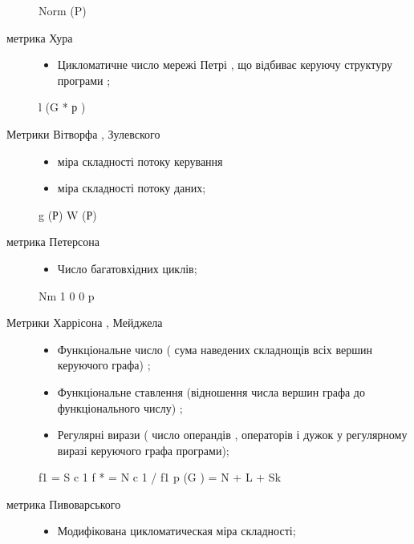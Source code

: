 \begin{description}
\begin{itemize}
\end{itemize}

Norm (P)

\item[{метрика Хура}] \leavevmode\begin{itemize}
\item {} 
Цикломатичне число мережі Петрі , що відбиває керуючу структуру програми ;

\end{itemize}

l (G * р )

\item[{Метрики Вітворфа , Зулевского}] \leavevmode\begin{itemize}
\item {} 
міра складності потоку керування

\item {} 
міра складності потоку даних;

\end{itemize}

g (Р)
W (Р)

\item[{метрика Петерсона}] \leavevmode\begin{itemize}
\item {} 
Число багатовхідних циклів;

\end{itemize}

Nm 1 0 0 p

\item[{Метрики Харрісона , Мейджела}] \leavevmode\begin{itemize}
\item {} 
Функціональне число ( сума наведених складнощів всіх вершин керуючого графа) ;

\item {} 
Функціональне ставлення (відношення числа вершин графа до функціонального числу) ;

\item {} 
Регулярні вирази ( число операндів , операторів і дужок у регулярному виразі керуючого графа програми);

\end{itemize}

f1 = S c 1
f * = N c 1 / f1
p (G ) = N + L + Sk

\item[{метрика Пивоварського}] \leavevmode\begin{itemize}
\item {} 
Модифікована цикломатическая міра складності;


\end{itemize}
\end{description}
